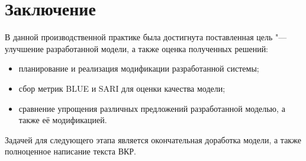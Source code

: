 \chapter*{Заключение} \label{ch-conclusion}

В данной производственной практике была достигнута поставленная цель "--- улучшение разработанной модели, а также оценка полученных решений:
\begin{itemize}%
  \item планирование и реализация модификации разработанной системы;
  \item сбор метрик BLUE и SARI для оценки качества модели;
  \item сравнение упрощения различных предложений разработанной моделью, а также её модификацией.
\end{itemize}

Задачей для следующего этапа является окончательная доработка модели, а также полноценное написание текста ВКР.
